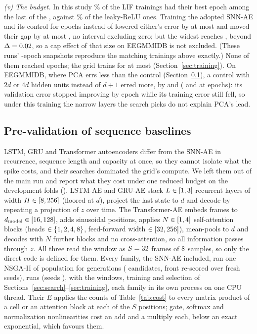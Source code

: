 \documentclass[conference]{IEEEtran}
\begin{document}
\par \emph{(v) The budget.} In this study \designCapLif\% of the LIF trainings had their best epoch
among the last \designCapWindow{} of the \designEpochs, against \designCapLrelu\% of the leaky-ReLU
ones. Training the adopted SNN-AE and its control for \budgetEpochs{} epochs instead of
\budgetProtocolEpochs{} lowered either's error by at most \budgetArmGainMax{} and moved their gap
by at most \budgetGapShiftMax{}, no interval excluding zero; but the widest reaches
\budgetGapShiftWidest{}, beyond $\Delta=0.02$, so a cap effect of that size on EEGMMIDB is not
excluded. (These runs' \budgetProtocolEpochs-epoch snapshots reproduce the \budgetSnapshots{}
matching trainings above exactly.) None of them reached \budgetEpochs{} epochs; the grid trains for
at most \cfgEpochs{} (Section~\ref{sec:training}). On EEGMMIDB, where PCA errs less than the control
(Section~\ref{sec:prevalidation}), a control with $2d$ or $4d$ hidden units instead of $d+1$ erred
more, by \budgetWideTwo{} and \budgetWideFour{} (\budgetWideTwoLong{} and \budgetWideFourLong{} at
\budgetEpochs{} epochs): its validation error stopped improving by epoch \budgetWideBest{} while
its training error still fell, so under this training the narrow layers the search picks do not
explain PCA's lead.

\subsection{Pre-validation of sequence baselines}
\label{sec:prevalidation}
\par LSTM, GRU and Transformer autoencoders differ from the SNN-AE in recurrence, sequence
length and capacity at once, so they cannot isolate what the spike costs, and their searches
dominated the grid's compute. We left them out of the main run and report what they cost under
one reduced budget on the development folds (\preFolds). LSTM-AE and GRU-AE stack
$L\in[1, 3]$ recurrent layers of width $H\in[8, 256]$ (floored at $d$),
project the last state to $d$ and decode by repeating a projection of $z$ over time. The
Transformer-AE embeds frames to $d_{\mathrm{model}}\in[16, 128]$, adds sinusoidal
positions, applies $N\in[1, 4]$ self-attention blocks (heads $\in\{1, 2, 4, 8\}$,
feed-forward width $\in[32, 256]$), mean-pools to $d$ and decodes with $N$ further blocks and
no cross-attention, so all information passes through $z$. All three read the window as
$S=32$ frames of $8$ samples, so only the direct code is defined for them.
Every family, the SNN-AE included, ran one NSGA-II of population \preGaPop{} for \preGaGen{}
generations (\preGaEvals{} candidates, front re-scored over \preGaWinnerSeeds{} fresh seeds),
\preRuns{} runs (seeds \preSeeds), with the windows, training and selection of
Sections~\ref{sec:search}--\ref{sec:training}, each family in its own process on one CPU
thread. Their $E$ applies the counts of Table~\ref{tab:cost} to every matrix product of a cell
or an attention block at each of the $S$ positions; gate, softmax and normalization
nonlinearities cost an add and a multiply each, below an exact exponential, which favours
them.
\end{document}
